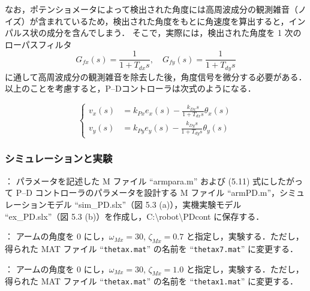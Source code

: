 なお，ポテンショメータによって検出された角度には高周波成分の観測雑音（ノイズ）が含まれているため，検出された角度をもとに角速度を算出すると，インパルス状の成分を含んでしまう．
そこで，実際には，検出された角度を 1 次のローパスフィルタ
\begin{equation}
    G_{fx}(s) = \frac{1}{1 + T_{dx}s}, \quad G_{fy}(s) = \frac{1}{1 + T_{dy}s}
\end{equation}
に通して高周波成分の観測雑音を除去した後，角度信号を微分する必要がある．以上のことを考慮すると，P--Dコントローラは次式のようになる．

\begin{equation}
\left\{
\begin{aligned}
    v_x(s) &= k_{Px} e_x(s) - \frac{k_{Dx}s}{1 + T_{dx}s} \theta_x(s) \\
    v_y(s) &= k_{Py} e_y(s) - \frac{k_{Dy}s}{1 + T_{dy}s} \theta_y(s)
\end{aligned}
\right.
\tag{5.11}
\end{equation}

\subsubsection{シミュレーションと実験}
\noindent
{}：
パラメータを記述した M ファイル ``armpara.m'' および (5.11) 式にしたがって P--D コントローラのパラメータを設計する M ファイル ``armPD.m''，シミュレーションモデル ``sim\_PD.slx''（図 5.3 (a)），実機実験モデル ``ex\_PD.slx''（図 5.3 (b)）を作成し，C:\textbackslash robot\textbackslash PDcont に保存する．

\noindent
{}：
アームの角度を 0 にし，$\omega_{Mx} = 30$, $\zeta_{Mx} = 0.7$ と指定し，実験する．ただし，得られた MAT ファイル ``\texttt{thetax.mat}'' の名前を ``\texttt{thetax7.mat}'' に変更する．

\vspace{1em}

\noindent
{}：
アームの角度を 0 にし，$\omega_{Mx} = 30$, $\zeta_{Mx} = 1.0$ と指定し，実験する．ただし，得られた MAT ファイル ``\texttt{thetax.mat}'' の名前を ``\texttt{thetax1.mat}'' に変更する．

\newpage

